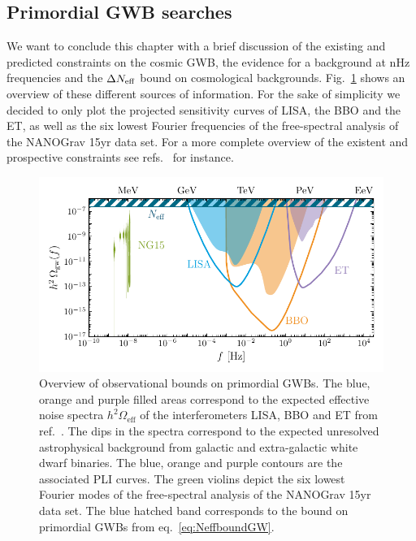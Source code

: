 \subsection{Primordial GWB searches} \label{sec:GWlimits}

We want to conclude this chapter with a brief discussion of the existing and predicted constraints on the cosmic \ac{GWB}, the evidence for a background at  nHz frequencies and the $\Delta N_\text{eff} $ bound on cosmological backgrounds. Fig.~\ref{fig:observability} shows an overview of these different sources of information. For the sake of simplicity we decided to only plot the projected sensitivity curves of \acs{LISA}, the \acf{BBO} and the \ac{ET}, as well as the six lowest Fourier frequencies of the free-spectral analysis of the \ac{NANOGrav} 15yr data set. For a more complete overview of the existent and prospective constraints see refs.~\cite{Schmitz:2020syl, Breitbach:2018ddu} for instance. 

\begin{figure}[t]
	\centering
		\includegraphics[width=\linewidth]{thesisplots/observability/observability.pdf}
	\caption{Overview of observational bounds on primordial \acp{GWB}. The blue, orange and purple filled areas correspond to the expected effective noise spectra $h^2\Omega_\text{eff}$ of the interferometers \ac{LISA}, \ac{BBO} and \ac{ET} from ref.~\cite{Breitbach:2018ddu}. The dips in the spectra correspond to the expected unresolved astrophysical background from galactic and extra-galactic white dwarf binaries. The blue, orange and purple contours are the associated \acs{PLI} curves. The green violins depict the six lowest Fourier modes of the free-spectral analysis of the \ac{NANOGrav} 15yr data set. The blue hatched band corresponds to the \Neff bound on primordial \acp{GWB} from eq.~\eqref{eq:NeffboundGW}.}
	\label{fig:observability}
\end{figure}

